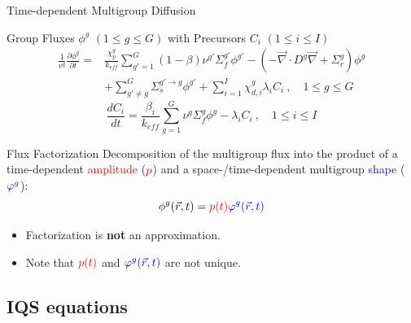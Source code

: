 \documentclass[8pt]{beamer}
\renewcommand{\div}{\vec{\nabla}\! \cdot \!}
\newcommand{\grad}{\vec{\nabla}}
\newcommand{\be}{\begin{equation*}}
\newcommand{\ee}{\end{equation*}}
\newcommand{\keff}{\ensuremath{k_{\textit{eff}}}}
\newcommand{\tcr}[1]{\textcolor{red}{#1}}
\newcommand{\tcb}[1]{\textcolor{blue}{#1}}
\begin{document}
\begin{frame}{Time-dependent Multigroup Diffusion}


\begin{block}{Group Fluxes $\phi^g$ $(1 \le g \le G )$ with Precursors $C_i$ $(1 \le i \le I)$}
\begin{align*}
\frac{1}{v^g} \frac{\partial \phi^g }{\partial t} =& \frac{\chi_p^g}{\keff} \sum_{g'=1}^G (1-\beta) \nu^{g'} \Sigma_f^{g'} \phi^{g'} -  \left( -\div D^g \grad  + \Sigma_r^g \right) \phi^g  \nonumber \\
&  + \sum_{g'\neq g}^G\Sigma_s^{g'\to g} \phi^{g'}  + \sum_{i=1}^I\chi_{d,i}^g\lambda_i C_i \ , \quad 1 \le g \le G 
\end{align*}
\be
\frac{dC_i}{dt} = \frac{\beta_i}{k_{eff}}\sum_{g=1}^G\nu^{g} \Sigma_f^g \phi^{g} - \lambda_i C_i \ , \quad 1 \le i \le I 
\ee
\end{block}


\begin{block}{Flux Factorization}
Decomposition of the multigroup flux into the product of a time-dependent \tcr{amplitude} ($\tcr{p}$) and a space-/time-dependent multigroup \tcb{shape} ($\tcb{\varphi^g}$):
\begin{equation*}
\phi^g(\vec{r},t) = \tcr{p(t)} \tcb{\varphi^g(\vec{r},t)}
\end{equation*}

\begin{itemize}
\item 
Factorization is \textbf{not} an approximation.
\item
Note that $\tcr{p(t)}$ and $\tcb{\varphi^g(\vec{r},t)}$ are not unique. 
\end{itemize}
\end{block}

\end{frame}


\subsection{IQS equations}
\end{document}
